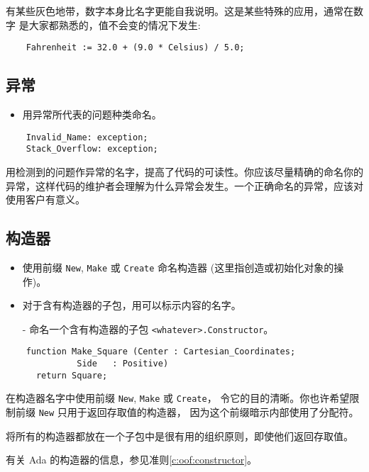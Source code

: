 \begin{blockindent}
有某些灰色地带，数字本身比名字更能自我说明。这是某些特殊的应用，通常在数字
是大家都熟悉的，值不会变的情况下发生:
\begin{lstlisting}
    Fahrenheit := 32.0 + (9.0 * Celsius) / 5.0;
\end{lstlisting}
\end{blockindent}

\subsection{异常}
\begin{itemize}
    \item 用异常所代表的问题种类命名。
\end{itemize}

\begin{lstlisting}
    Invalid_Name: exception;
    Stack_Overflow: exception;
\end{lstlisting}

\begin{blockindent}
用检测到的问题作异常的名字，提高了代码的可读性。你应该尽量精确的命名你的
异常，这样代码的维护者会理解为什么异常会发生。一个正确命名的异常，应该对
使用客户有意义。
\end{blockindent}

\subsection{构造器}
\begin{itemize}
    \item 使用前缀 \texttt{New}, \texttt{Make} 或 \texttt{Create}
命名构造器 (这里指创造或初始化对象的操作)。
    \item 对于含有构造器的子包，用可以标示内容的名字。
\end{itemize}

\begin{itemize}
    \item[-] 命名一个含有构造器的子包 \texttt{<whatever>.Constructor}。
\end{itemize}

\begin{lstlisting}
    function Make_Square (Center : Cartesian_Coordinates;
			  Side   : Positive)
      return Square;
\end{lstlisting}

\begin{blockindent}
在构造器名字中使用前缀 \texttt{New}, \texttt{Make} 或 \texttt{Create}，
令它的目的清晰。你也许希望限制前缀 \texttt{New} 只用于返回存取值的构造器，
因为这个前缀暗示内部使用了分配符。

将所有的构造器都放在一个子包中是很有用的组织原则，即使他们返回存取值。

有关 Ada 的构造器的信息，参见准则\ref{c:oof:constructor}。
\end{blockindent}

